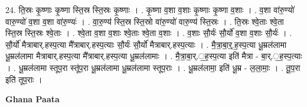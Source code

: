 \documentclass[17pt]{extarticle}
\begin{document}
24. ति॒स्रः कृ॒ष्णाः कृ॒ष्णा स्ति॒स्र स्ति॒स्रः कृ॒ष्णाः । . कृ॒ष्णा व॒शा व॒शाः कृ॒ष्णाः कृ॒ष्णा व॒शाः । . व॒शा वा॑रु॒ण्यो॑ वारु॒ण्यो॑ व॒शा व॒शा वा॑रु॒ण्यः॑ । . वा॒रु॒ण्य॑ स्ति॒स्र स्ति॒स्रो वा॑रु॒ण्यो॑ वारु॒ण्य॑ स्ति॒स्रः । . ति॒स्रः श्वे॒ताः श्वे॒ता स्ति॒स्र स्ति॒स्रः श्वे॒ताः । . श्वे॒ता व॒शा व॒शाः श्वे॒ताः श्वे॒ता व॒शाः । . व॒शाः सौ॒र्यः॑ सौ॒र्यो॑ व॒शा व॒शाः सौ॒र्यः॑ । . सौ॒र्यो॑ मैत्राबार्.हस्प॒त्या मै᳚त्राबार्.हस्प॒त्याः सौ॒र्यः॑ सौ॒र्यो॑ मैत्राबार्.हस्प॒त्याः । . मै॒त्रा॒बा॒र्॒.ह॒स्प॒त्या धू॒म्रल॑लामा धू॒म्रल॑लामा मैत्राबार्.हस्प॒त्या मै᳚त्राबार्.हस्प॒त्या धू॒म्रल॑लामाः । . मै॒त्रा॒बा॒र्.॒ह॒स्प॒त्या इति॑ मैत्रा - बा॒र्.॒ह॒स्प॒त्याः । . धू॒म्रल॑लामा स्तूप॒रा स्तू॑प॒रा धू॒म्रल॑लामा धू॒म्रल॑लामा स्तूप॒राः । . धू॒म्रल॑लामा॒ इति॑ धू॒म्र - ल॒ला॒माः॒ । . तू॒प॒रा इति॑ तूप॒राः । \newline

\textbf{Ghana Paata } \newline
\end{document}
